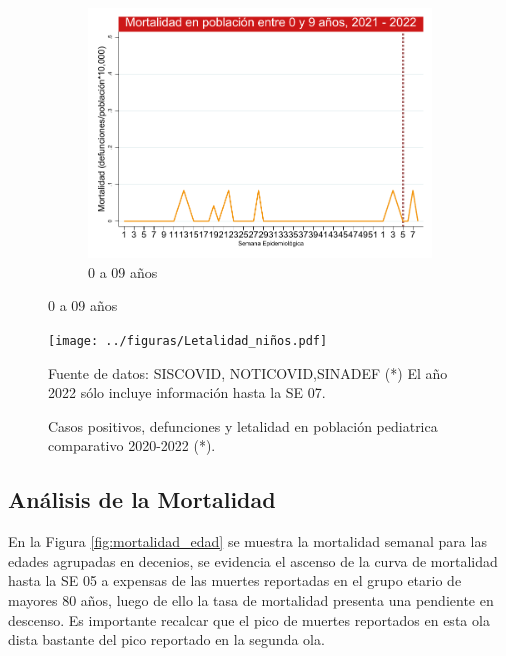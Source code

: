 \documentclass[12pt,a4paper,openany]{book}
\begin{document}
\begin{figure}[h]
	\vspace{10mm}
	\begin{subfigure}[b]{0.45\textwidth}
		\centering
		\includegraphics[width=\textwidth]{../figuras/mortalidad_edad_0.pdf}
		\caption{0 a 09 años}
	\end{subfigure}
\end{figure}

\begin{figure}[h]
	\caption{Casos positivos, defunciones y letalidad en población pediatrica comparativo 2020-2022 (*).}\label{fig:letalidad_niños}
	\begin{center}
		\texttt{[image: ../figuras/Letalidad\_niños.pdf]}
	\end{center}
	{\footnotesize Fuente de datos: SISCOVID, NOTICOVID,SINADEF (*) El año 2022 sólo incluye información hasta la SE 07.} 
\end{figure}
\clearpage

	\subsection*{Análisis de la Mortalidad}

\noindent En la Figura \ref{fig:mortalidad_edad} se muestra la mortalidad semanal para las edades agrupadas en decenios, se evidencia el ascenso de la curva de mortalidad hasta la SE 05 a expensas de las muertes reportadas en el grupo etario de mayores 80 años, luego de ello la tasa de mortalidad presenta una pendiente en descenso. Es importante recalcar que el pico de muertes reportados en esta ola dista bastante del pico reportado en la segunda ola.  
	 	
\end{document}

